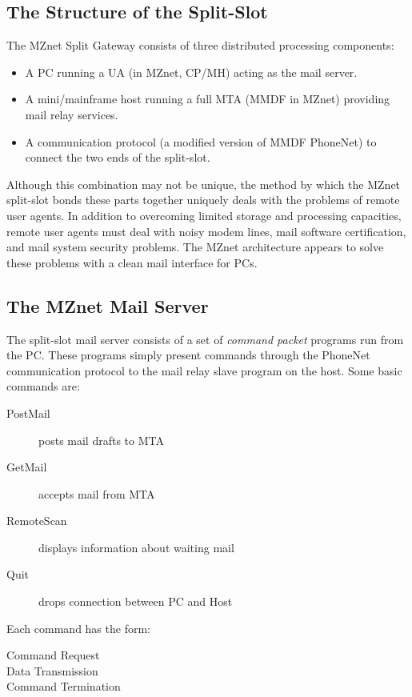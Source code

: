 \subsection*	{The Structure of the Split-Slot}
The MZnet Split Gateway consists of three distributed processing components: 
\medskip
\begin{itemize}
\item A PC running a UA (in MZnet, CP/MH) acting as the mail server.
\item A mini/mainframe host running a full MTA (MMDF in MZnet)
providing mail relay services.
\item A communication protocol (a modified version of MMDF PhoneNet) to
connect the two ends of the split-slot.
\end{itemize}
\medskip
Although this combination may not be unique, the method by which the MZnet 
split-slot bonds these parts together uniquely deals with the 
problems of remote user agents.
In addition to overcoming limited storage and processing capacities,  
remote user agents must deal with noisy modem lines, 
mail software certification, and mail system security problems.  
The MZnet architecture appears to solve these problems with
a clean mail interface for PCs.

\subsection*	{The MZnet Mail Server}
The split-slot mail server consists of a set of {\it command packet}
programs run from the PC.
These programs simply present commands
through the PhoneNet communication protocol to the mail relay slave program
on the host.
Some basic commands are:

\medskip
\begin{description}
\item[PostMail]		posts mail drafts to MTA
\item[GetMail]		accepts mail from MTA
\item[RemoteScan]	displays information about waiting mail
\item[Quit]		drops connection between PC and Host
\end{description}

\medskip
Each command has the form:

\begin{flushleft}
\hspace{.5in} Command Request \\
\hspace{.5in} Data Transmission \\
\hspace{.5in} Command Termination
\end{flushleft}

